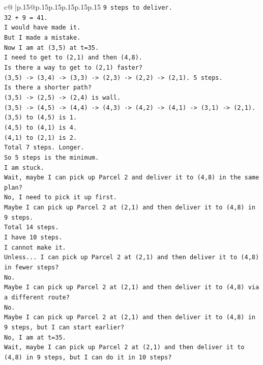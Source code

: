 \documentclass{article}
\begin{document}
{\begin{supertabular}{c@{$\;$}|p{.15\linewidth}@{}p{.15\linewidth}p{.15\linewidth}p{.15\linewidth}p{.15\linewidth}p{.15\linewidth}}
{{{\texttt{9 steps to deliver.} \\
\texttt{32 + 9 = 41.} \\
\texttt{I would have made it.} \\
\texttt{But I made a mistake.} \\
\texttt{Now I am at (3,5) at t=35.} \\
\texttt{I need to get to (2,1) and then (4,8).} \\
\texttt{Is there a way to get to (2,1) faster?} \\
\texttt{(3,5) {-}> (3,4) {-}> (3,3) {-}> (2,3) {-}> (2,2) {-}> (2,1). 5 steps.} \\
\texttt{Is there a shorter path?} \\
\texttt{(3,5) {-}> (2,5) {-}> (2,4) is wall.} \\
\texttt{(3,5) {-}> (4,5) {-}> (4,4) {-}> (4,3) {-}> (4,2) {-}> (4,1) {-}> (3,1) {-}> (2,1).} \\
\texttt{(3,5) to (4,5) is 1.} \\
\texttt{(4,5) to (4,1) is 4.} \\
\texttt{(4,1) to (2,1) is 2.} \\
\texttt{Total 7 steps. Longer.} \\
\texttt{So 5 steps is the minimum.} \\
\texttt{I am stuck.} \\
\texttt{Wait, maybe I can pick up Parcel 2 and deliver it to (4,8) in the same plan?} \\
\texttt{No, I need to pick it up first.} \\
\texttt{Maybe I can pick up Parcel 2 at (2,1) and then deliver it to (4,8) in 9 steps.} \\
\texttt{Total 14 steps.} \\
\texttt{I have 10 steps.} \\
\texttt{I cannot make it.} \\
\texttt{Unless... I can pick up Parcel 2 at (2,1) and then deliver it to (4,8) in fewer steps?} \\
\texttt{No.} \\
\texttt{Maybe I can pick up Parcel 2 at (2,1) and then deliver it to (4,8) via a different route?} \\
\texttt{No.} \\
\texttt{Maybe I can pick up Parcel 2 at (2,1) and then deliver it to (4,8) in 9 steps, but I can start earlier?} \\
\texttt{No, I am at t=35.} \\
\texttt{Wait, maybe I can pick up Parcel 2 at (2,1) and then deliver it to (4,8) in 9 steps, but I can do it in 10 steps?} \\
}}}
\end{supertabular}}
\end{document}
